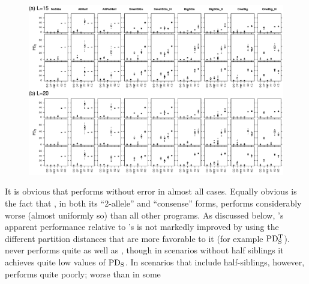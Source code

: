 \documentclass[11pt]{article}
\begin{document}
{%

\begin{figure}
\begin{center}
\includegraphics[width=\textwidth]{images/boxplots_for_paper25_num2.pdf}
\caption[Boxplot representation of values of $\PDS$ for $A=25$ alleles and $L=20$ ({\em a}) and $L=25$ 
({\em b}) loci for all methods (CO=\colony; CP=\colony{}-P; PRT=\prt{}; FF=\familyfinder; K2=
\kinalyzer{} 2-allele algorithm; KC=\kinalyzer{} consensus algorithm) and all $n75$ scenarios (names 
listed along top).  For each scenario, the top panel shows results for data with no genotyping errors, 
the large middle panel for data with $d=.02$ and $m=.01$ and the bottom panel for $d=.07$ and $m=.03$.]
{}
\label{fig:boxp1}
\end{center}
\end{figure}
It is obvious that \colony{} performs without error in almost all cases.  Equally obvious is the fact 
that \kinalyzer{}, in both its ``2-allele'' and ``consense'' forms, performs considerably worse (almost 
uniformly so) than all other programs.  As discussed below, \kinalyzer{}'s apparent performance 
relative to \colony{}'s is not markedly improved by using the different partition distances that are 
more favorable to it (for example $\mathrm{PD_S^T}$).  \familyfinder{} never performs quite as well as \colony{}, 
though in scenarios without half siblings it achieves quite low values of $\PDS$. In scenarios that 
include half-siblings, however, \familyfinder{} performs quite poorly; worse than \kinalyzer{} in some 
}
\end{document}
